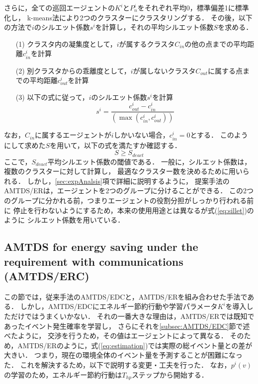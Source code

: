 \documentclass[12pt,a4j,twoside]{jarticle}
\begin{document}
  さらに，全ての巡回エージェントの$K^i$と$P^i_n$をそれぞれ平均0，標準偏差1に標準化し，
  k-means法により2つのクラスターにクラスタリングする．
  その後，以下の方法で$i$のシルエット係数$s^i$を計算し，それの平均シルエット係数$S$を求める．
  \begin{enumerate}
    \item[(1)] クラスタ内の凝集度として，$i$が属するクラスタ$C_{in}$の他の点までの平均距離$c^i_{in}$を計算
    \item[(2)] 別クラスタからの乖離度として，$i$が属しないクラスタ$C_{out}$に属する点までの平均距離$c^i_{out}$を計算
    \item[(3)] 以下の式に従って，$i$のシルエット係数$s^i$を計算
                \begin{equation}
                  s^i = \dfrac{c^i_{out} - c^i_{in}}{(\max(c^i_{in}, c^i_{out}))}
                \end{equation}
  \end{enumerate}
  なお，$C_{in}$に属するエージェントが$i$しかいない場合，$c^i_{in} = 0$とする．
  このようにして求めた$S$を用いて，以下の式を満たすか確認する．
    \begin{equation}\label{eq:sillet}
      S \geq S_{deact}
    \end{equation}
  ここで，$S_{deact}$平均シルエット係数の閾値である．
  一般に，シルエット係数は，複数のクラスターに対して計算し，
  最適なクラスター数を決めるために用いられる．
  しかし，\ref{sec:expAnalsis}項で詳細に説明するように，
  提案手法のAMTDS/ERは，エージェントを2つのグループに分けることができる．
  この2つのグループに分かれる前，つまりエージェントの役割分担がしっかり行われる前に
  停止を行わないようにするため，本来の使用用途とは異なるが式(\ref{eq:sillet})のように
  シルエット係数を用いている．
 
  \subsection{AMTDS for energy saving under the requirement with communications (AMTDS/ERC)}
  この節では，従来手法のAMTDS/EDCと，AMTDS/ERを組み合わせた手法である．
  しかし，AMTDS/EDCにエネルギー節約行動や学習パラメータ$K^i$を導入しただけではうまくいかない．
  それの一番大きな理由は，AMTDS/ERでは既知であったイベント発生確率を学習し，
  さらにそれを\ref{subsec:AMTDS/EDC}節で述べたように，
  交渉を行うため，その値はエージェントによって異なる．
  そのため，AMTDS/ERのように，式(\ref{eq:estimation})では実際の総イベント量との差が大きい．
  つまり，現在の環境全体のイベント量を予測することが困難になった．
  これを解決するため，以下で説明する変更・工夫を行った．
  なお，$p^i(v)$の学習のため，エネルギー節約行動は$T_{hp}$ステップから開始する．
  
\end{document}
